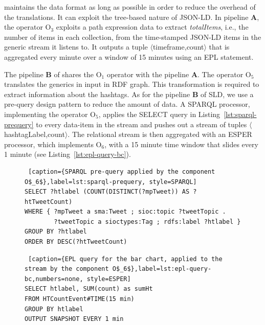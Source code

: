 \sti{} maintains the data format as long as possible in order to reduce the overhead of the translations. It can exploit the tree-based nature of JSON-LD. In pipeline \textbf{A}, the operator O$_3$ exploits a path expression data to extract \textit{totalItems}, i.e., the number of items in each collection, from the time-stamped JSON-LD items in the generic stream it listens to. It outputs a tuple $\langle$timeframe,count$\rangle$ that is aggregated every minute over a window of 15 minutes using an EPL statement.

The pipeline \textbf{B} of \sti{} shares the O$_1$ operator with the pipeline \textbf{A}.
The operator O$_5$ translates the generics in input in RDF graph. This transformation is required to extract information about the hashtags. As for the pipeline \textbf{B} of SLD, we use a pre-query design pattern to reduce the amount of data. A SPARQL processor, implementing the operator O$_5$, applies the SELECT query in Listing~\ref{lst:sparql-prequery} to every data-item in the stream and pushes out a stream of tuples $\langle$hashtagLabel,count$\rangle$. The relational stream is then aggregated with an ESPER processor, which implements O$_6$, with a 15 minute time window that slides every 1 minute (see Listing~\ref{lst:epl-query-bc}). 

\begin{figure}[ht]
\begin{minipage}{0.95\linewidth}
\centering
\begin{lstlisting} [caption={SPARQL pre-query applied by the component O$_6$},label=lst:sparql-prequery, style=SPARQL]
SELECT ?htlabel (COUNT(DISTINCT(?mpTweet)) AS ?htTweetCount) 
WHERE { ?mpTweet a sma:Tweet ; sioc:topic ?tweetTopic . 
        ?tweetTopic a sioctypes:Tag ; rdfs:label ?htlabel } 
GROUP BY ?htlabel 
ORDER BY DESC(?htTweetCount) 
\end{lstlisting}
\end{minipage}
\end{figure}

\begin{figure}[ht]
\begin{minipage}{0.95\linewidth}
\begin{lstlisting} [caption={EPL query for the bar chart, applied to the stream by the component O$_6$},label=lst:epl-query-bc,numbers=none, style=ESPER]
SELECT htlabel, SUM(count) as sumHt 
FROM HTCountEvent#TIME(15 min) 
GROUP BY htlabel 
OUTPUT SNAPSHOT EVERY 1 min 
\end{lstlisting}
\end{minipage}
\end{figure}

